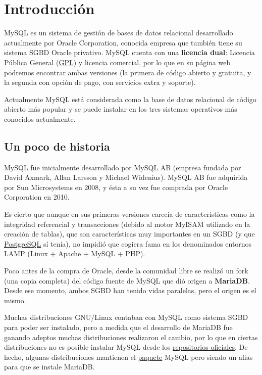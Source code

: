 \section{Introducción}
MySQL es un sistema de gestión de bases de datos relacional desarrollado actualmente por Oracle Corporation, conocida empresa que también tiene su sistema SGBD Oracle privativo. MySQL cuenta con una \textbf{licencia dual}: Licencia Pública General (\hyperlink{licencias_libres}{GPL}) y licencia comercial, por lo que en su página web podremos encontrar ambas versiones (la primera de código abierto y gratuita, y la segunda con opción de pago, con servicios extra  y soporte).

Actualmente MySQL está considerada como la base de datos relacional de código abierto más popular y se puede instalar en los tres sistemas operativos más conocidos actualmente.


\subsection{Un poco de historia}
MySQL fue inicialmente desarrollado por MySQL AB (empresa fundada por David Axmark, Allan Larsson y Michael Widenius). MySQL AB fue adquirida por Sun Microsystems en 2008, y ésta a su vez fue comprada por Oracle Corporation en 2010.

Es cierto que aunque en sus primeras versiones carecía de características como la integridad referencial y transacciones (debido al motor MyISAM utilizado en la creación de tablas), que son características muy importantes en un SGBD (y que \href{https://es.wikipedia.org/wiki/PostgreSQL}{PostgreSQL} sí tenía), no impidió que cogiera fama en los denominados entornos LAMP (Linux + Apache + MySQL + PHP).

Poco antes de la compra de Oracle, desde la comunidad libre se realizó un fork (una copia completa) del código fuente de MySQL que dió origen a \textbf{MariaDB}. Desde ese momento, ambos SGBD han tenido vidas paralelas, pero el origen es el mismo.

Muchas distribuciones GNU/Linux contaban con MySQL como sistema SGBD para poder ser instalado, pero a medida que el desarrollo de MariaDB fue ganando adeptos muchas distribuciones realizaron el cambio, por lo que en ciertas distribuciones no es posible instalar MySQL desde los \hyperlink{repositorio_de_software}{repositorios oficiales}. De hecho, algunas distribuciones mantienen el \hyperlink{paquete_de_software}{paquete} MySQL pero siendo un alias para que se instale MariaDB.

